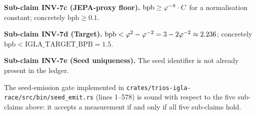 \textbf{Sub-claim INV-7c (JEPA-proxy floor).}
\(\mathrm{bpb} \geq \varphi^{-8} \cdot C\) for a normalisation
constant; concretely \(\mathrm{bpb} \geq 0.1\).

\textbf{Sub-claim INV-7d (Target).}
\(\mathrm{bpb} < \varphi^{2} - \varphi^{-2} = 3 - 2\varphi^{-2} \approx
2.236\); concretely \(\mathrm{bpb} <
\mathrm{IGLA\_TARGET\_BPB} = 1.5\).

\textbf{Sub-claim INV-7e (Seed uniqueness).}
The seed identifier is not already present in the ledger.

\begin{theorem}\label{thm:inv7-soundness}
  The seed-emission gate implemented in
  \texttt{crates/trios-igla-race/src/bin/seed\_emit.rs} (lines 1--578)
  is sound with respect to the five sub-claims above: it accepts a
  measurement if and only if all five sub-claims hold.
\end{theorem}

